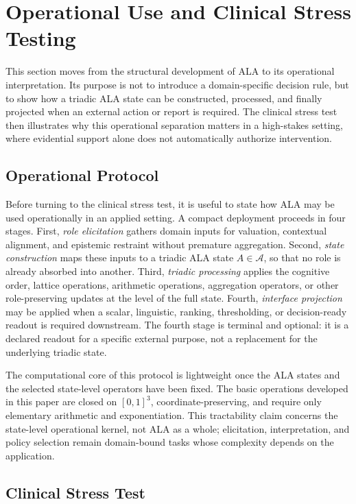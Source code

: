 \documentclass[reqno,final]{amsart}
\theoremstyle{definition}
\theoremstyle{plain}
\theoremstyle{remark}
\providecommand{\cA}{\mathcal{A}}
\begin{document}
\section{Operational Use and Clinical Stress Testing}

This section moves from the structural development of ALA to its operational interpretation. Its purpose is not to introduce a domain-specific decision rule, but to show how a triadic ALA state can be constructed, processed, and finally projected when an external action or report is required. The clinical stress test then illustrates why this operational separation matters in a high-stakes setting, where evidential support alone does not automatically authorize intervention.

\subsection{Operational Protocol}
\label{subsec:compact-operational-protocol}

Before turning to the clinical stress test, it is useful to state how ALA may be used operationally in an applied setting. A compact deployment proceeds in four stages. First, \emph{role elicitation} gathers domain inputs for valuation, contextual alignment, and epistemic restraint without premature aggregation. Second, \emph{state construction} maps these inputs to a triadic ALA state \(A\in\cA\), so that no role is already absorbed into another. Third, \emph{triadic processing} applies the cognitive order, lattice operations, arithmetic operations, aggregation operators, or other role-preserving updates at the level of the full state. Fourth, \emph{interface projection} may be applied when a scalar, linguistic, ranking, thresholding, or decision-ready readout is required downstream. The fourth stage is terminal and optional: it is a declared readout for a specific external purpose, not a replacement for the underlying triadic state.

The computational core of this protocol is lightweight once the ALA states and the selected state-level operators have been fixed. The basic operations developed in this paper are closed on \([0,1]^3\), coordinate-preserving, and require only elementary arithmetic and exponentiation. This tractability claim concerns the state-level operational kernel, not ALA as a whole; elicitation, interpretation, and policy selection remain domain-bound tasks whose complexity depends on the application.

\subsection{Clinical Stress Test}
\label{subsec:clinical-stress-test}
\end{document}
